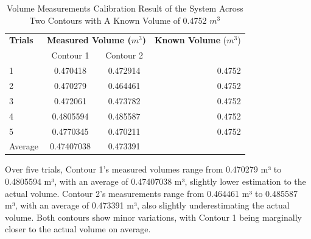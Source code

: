 \begin{enumerate}
	      \begin{table}[H]
		      \centering
		      \begin{threeparttable}
			      \caption{Volume Measurements Calibration Result of the System Across Two Contours with A Known Volume of 0.4752 $m^3$}
			      \label{table:test_case_2-2_results}
			      \begin{tabular}{l c c r}
				      \toprule
				      \textbf{Trials} & \multicolumn{2}{c}{\textbf{Measured Volume ($m^{3}$)}} & \textbf{Known Volume} ($m^{3}$)          \\
				      {}              & Contour 1                                              & Contour 2                       & {}     \\ \midrule
				      1               & 0.470418                                               & 0.472914                        & 0.4752 \\
				      2               & 0.470279                                               & 0.464461                        & 0.4752 \\
				      3               & 0.472061                                               & 0.473782                        & 0.4752 \\
				      4               & 0.4805594                                              & 0.485587                        & 0.4752 \\
				      5               & 0.4770345                                              & 0.470211                        & 0.4752 \\ \midrule
				      Average         & 0.47407038                                             & 0.473391                        & {}     \\ \bottomrule
			      \end{tabular}
		      \end{threeparttable}
	      \end{table}


	      Over five trials, Contour 1's measured volumes range from 0.470279 m³ to 0.4805594 m³, with an average of 0.47407038 m³, slightly lower estimation to the actual volume. Contour 2's measurements range from 0.464461 m³ to 0.485587 m³, with an average of 0.473391 m³, also slightly underestimating the actual volume. Both contours show minor variations, with Contour 1 being marginally closer to the actual volume on average. \\


\end{enumerate}
